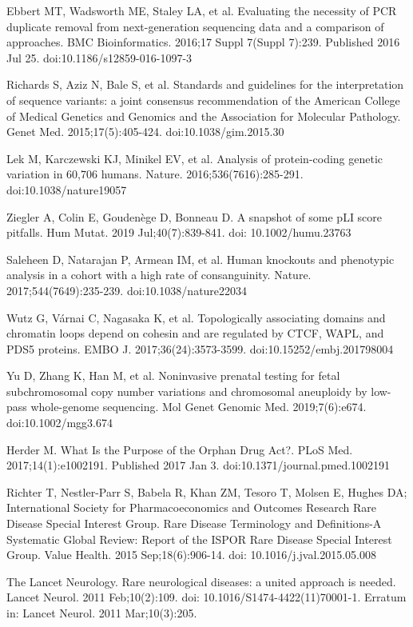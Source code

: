 \documentclass[a4paper,12pt]{article}
\begin{document}
\begin{thebibliography}{100}
Ebbert MT, Wadsworth ME, Staley LA, et al. Evaluating the necessity of PCR duplicate removal from next-generation sequencing data and a comparison of approaches. BMC Bioinformatics. 2016;17 Suppl 7(Suppl 7):239. Published 2016 Jul 25. doi:10.1186/s12859-016-1097-3

Richards S, Aziz N, Bale S, et al. Standards and guidelines for the interpretation of sequence variants: a joint consensus recommendation of the American College of Medical Genetics and Genomics and the Association for Molecular Pathology. Genet Med. 2015;17(5):405-424. doi:10.1038/gim.2015.30

Lek M, Karczewski KJ, Minikel EV, et al. Analysis of protein-coding genetic variation in 60,706 humans. Nature. 2016;536(7616):285-291. doi:10.1038/nature19057

Ziegler A, Colin E, Goudenège D, Bonneau D. A snapshot of some pLI score pitfalls. Hum Mutat. 2019 Jul;40(7):839-841. doi: 10.1002/humu.23763

Saleheen D, Natarajan P, Armean IM, et al. Human knockouts and phenotypic analysis in a cohort with a high rate of consanguinity. Nature. 2017;544(7649):235-239. doi:10.1038/nature22034

Wutz G, Várnai C, Nagasaka K, et al. Topologically associating domains and chromatin loops depend on cohesin and are regulated by CTCF, WAPL, and PDS5 proteins. EMBO J. 2017;36(24):3573-3599. doi:10.15252/embj.201798004

Yu D, Zhang K, Han M, et al. Noninvasive prenatal testing for fetal subchromosomal copy number variations and chromosomal aneuploidy by low-pass whole-genome sequencing. Mol Genet Genomic Med. 2019;7(6):e674. doi:10.1002/mgg3.674

Herder M. What Is the Purpose of the Orphan Drug Act?. PLoS Med. 2017;14(1):e1002191. Published 2017 Jan 3. doi:10.1371/journal.pmed.1002191

Richter T, Nestler-Parr S, Babela R, Khan ZM, Tesoro T, Molsen E, Hughes DA; International Society for Pharmacoeconomics and Outcomes Research Rare Disease Special Interest Group. Rare Disease Terminology and Definitions-A Systematic Global Review: Report of the ISPOR Rare Disease Special Interest Group. Value Health. 2015 Sep;18(6):906-14. doi: 10.1016/j.jval.2015.05.008

The Lancet Neurology. Rare neurological diseases: a united approach is needed. Lancet Neurol. 2011 Feb;10(2):109. doi: 10.1016/S1474-4422(11)70001-1. Erratum in: Lancet Neurol. 2011 Mar;10(3):205.


\end{thebibliography}
\end{document}
